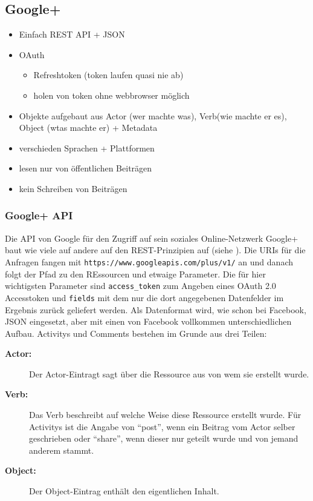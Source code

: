 

\subsection{Google+} %
\label{sub:google_plus_connector}

\begin{itemize}
    \item Einfach REST API + JSON
    \item OAuth
    \begin{itemize}
        \item Refreshtoken (token laufen quasi nie ab)
        \item holen von token ohne webbrowser möglich
    \end{itemize}
    \item Objekte aufgebaut aus Actor (wer machte was), Verb(wie machte er es), Object (wtas machte er) + Metadata
    \item verschieden Sprachen + Plattformen
    \item lesen nur von öffentlichen Beiträgen
    \item kein Schreiben von Beiträgen
\end{itemize}

\subsubsection{Google+ API} %
\label{ssub:google_api}

Die API von Google für den Zugriff auf sein soziales Online-Netzwerk Google+ baut wie viele auf andere auf den REST-Prinzipien auf (siehe \cite{GooglePlusApi}). Die URIs für die Anfragen fangen mit \texttt{https://www.googleapis.com/plus/v1/} an und danach folgt der Pfad zu den REssourcen und etwaige Parameter. Die für hier wichtigsten Parameter sind \texttt{access\_token} zum Angeben eines OAuth 2.0 Accesstoken und \texttt{fields} mit dem nur die dort angegebenen Datenfelder im Ergebnis zurück geliefert werden. Als Datenformat wird, wie schon bei Facebook, JSON eingesetzt, aber mit einen von Facebook vollkommen unterschiedlichen Aufbau. Activitys und Comments bestehen im Grunde aus drei Teilen:

\begin{description}
    \item[\textbf{Actor:}] Der Actor-Eintragt sagt über die Ressource aus von wem sie erstellt wurde. 
    \item[\textbf{Verb:}] Das Verb beschreibt auf welche Weise diese Ressource erstellt wurde. Für Activitys ist die Angabe von \enquote{post}, wenn ein Beitrag vom Actor selber geschrieben oder \enquote{share}, wenn dieser nur geteilt wurde und von jemand anderem stammt. 
    \item[\textbf{Object:}] Der Object-Eintrag enthält den eigentlichen Inhalt.
\end{description}

